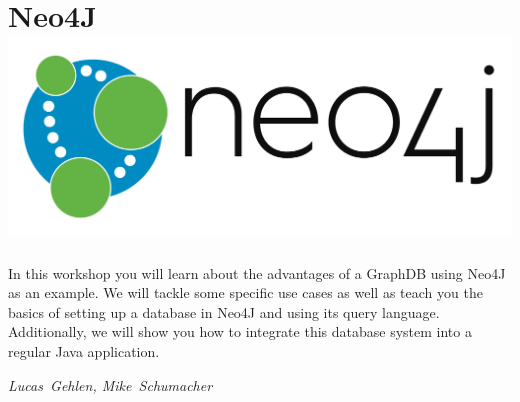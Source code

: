 
\section*{Neo4J\hfill\includegraphics[width=.35\linewidth]{images/neo4j_logo.png}}
In this workshop you will learn about the advantages of a GraphDB using Neo4J as an example. We will tackle some specific use cases as well as teach you the basics of setting up a database in Neo4J and using its query language.
Additionally, we will show you how to integrate this database system into a regular Java application.

\hfill\textit{Lucas~Gehlen, Mike~Schumacher}
